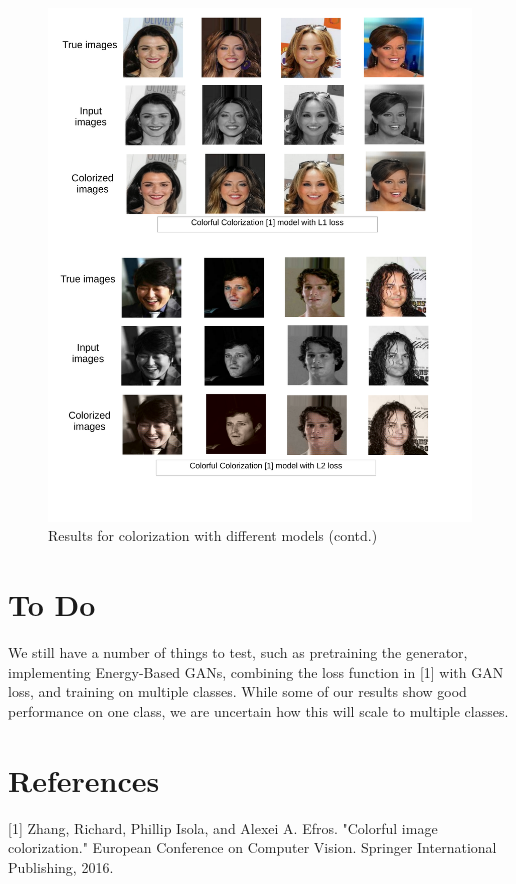 \documentclass[11pt]{article}
\begin{document}
\begin{figure}[t]
\vspace{-10mm}
\hspace{-20mm}
\includegraphics [scale=0.35]{4.pdf}
\vspace{-18mm}
\caption{Results for colorization with different models (contd.)}
\label{fig:2}
\end{figure}

\newpage
\section{To Do}
We still have a number of things to test, such as pretraining the generator, implementing Energy-Based GANs,
combining the loss function in [1] with GAN loss, and training on multiple classes. While some of our results
show good performance on one class, we are uncertain how this will scale to multiple classes.



\section{References}
[1] Zhang, Richard, Phillip Isola, and Alexei A. Efros. "Colorful image colorization." 
European Conference on Computer Vision. Springer International Publishing, 2016.
\vspace{2pt}
\end{document}
